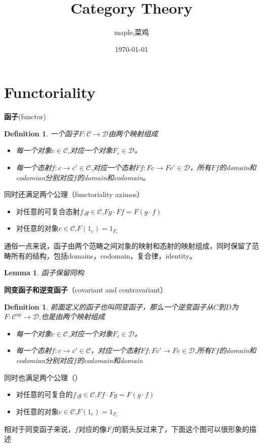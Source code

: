 \documentclass{article}
\title{Category Theory}
\author{maple,菜鸡}
\date{\today}
\newtheorem{lemma}[theorem]{Lemma}
\newtheorem{definition}[theorem]{Definition}
\begin{document}
\maketitle

\section{Functoriality}

\begin{flushleft}
\textbf{函子}(functor)\\
\begin{definition}
一个函子$F \colon \mathcal{C} \rightarrow \mathcal{D}$由两个映射组成
\begin{itemize}
 \item 每一个对象$c \in \mathcal{C}$,对应一个对象$F_c \in \mathcal{D}$。
 \item 每一个态射$f \colon c \rightarrow	c' \in \mathcal{C}$,对应一个态射$Ff \colon Fc \rightarrow Fc' \in \mathcal{D}$，所有$Ff$的domain和codomian分别对应$f$的domain和codomain。 
\end{itemize}
\end{definition}
同时还满足两个公理（functoriality aximos）
\begin{itemize}
 	\item 对任意的可复合态射$f$,$g \in \mathcal{C}$,$Fg \cdot Ff = F(g \cdot f)$
 	\item 对任意的对象$c \in \mathcal{C}$,$F(1_c)=1_{F_c}$
\end{itemize}
通俗一点来说，函子由两个范畴之间对象的映射和态射的映射组成，同时保留了范畴所有的结构，包括domains，codomain，复合律，identity。
\end{flushleft}

\begin{lemma}
函子保留同构
\end{lemma}

\begin{flushleft}
\textbf{同变函子和逆变函子}（covariant and contravariant）\\
\begin{definition}
前面定义的函子也叫同变函子，那么一个逆变函子从$C$到$D$为$F: \mathcal{C}^{op} \rightarrow \mathcal{D} $,也是由两个映射组成
\begin{itemize}
	\item 每一个对象$c \in \mathcal{C}$,对应一个对象$F_c \in \mathcal{D}$。
	\item 每一个态射$f \colon c \rightarrow	c' \in \mathcal{C}$，对应一个态射$Ff \colon Fc' \rightarrow Fc \in \mathcal{D}$,所有$Ff$的domain和codomian分别对应$f$的codomain和domain
\end{itemize}
\end{definition}
同时也满足两个公理（）\\
\begin{itemize}
	\item 对任意的可复合的$f$,$g \in \mathcal{C}$,$Ff \cdot Fg = F(g \cdot f)$
	\item 对任意的对象$c \in \mathcal{C}$,$F(1_c)=1_{F_c}$
\end{itemize}
相对于同变函子来说，$f$对应的像$Ff$的箭头反过来了，下面这个图可以很形象的描述	
\end{flushleft}
\end{document}
